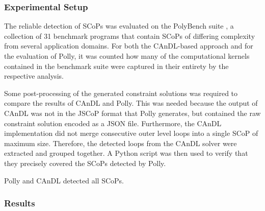 \subsubsection{Experimental Setup}

    The reliable detection of SCoPs was evaluated on the PolyBench suite
    \citep{polybench}, a collection of 31 benchmark programs that contain SCoPs
    of differing complexity from several application domains.
    For both the CAnDL-based approach and for the evaluation of Polly, it was
    counted how many of the computational kernels contained in the benchmark
    suite were captured in their entirety by the respective analysis.

    Some post-processing of the generated constraint solutions was required to
    compare the results of CAnDL and Polly.
    This was needed because the output of CAnDL was not in the JSCoP format
    that Polly generates, but contained the raw constraint solution
    encoded as a JSON file.
    Furthermore, the CAnDL implementation did not merge consecutive outer level
    loops into a single SCoP of maximum size.
    Therefore, the detected loops from the CAnDL solver were extracted and
    grouped together.
    A Python script was then used to verify that they precisely covered the
    SCoPs detected by Polly.

\begin{table}[t]
    
    \caption{Polly and CAnDL detected all SCoPs.}
    \label{fig:candlvspolly}
\end{table}

\subsubsection{Results}

